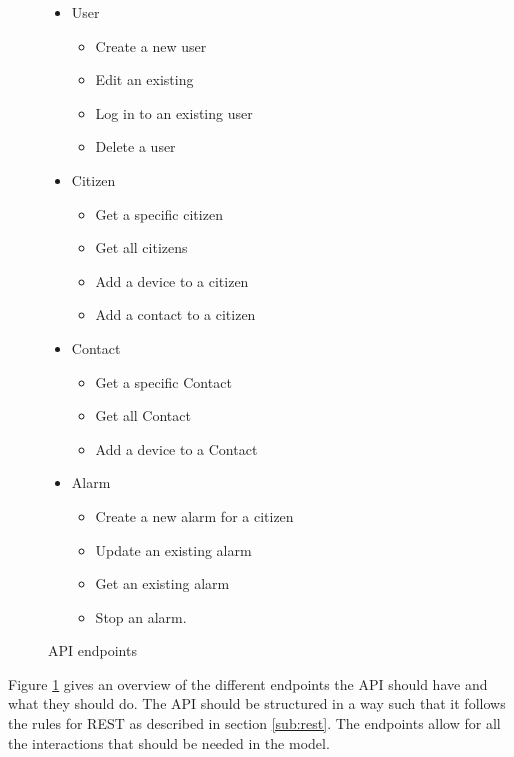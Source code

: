 \begin{figure}[H]
    \centering
    \begin{itemize}
        \item User
        \begin{itemize}
            \item Create a new user
            \item Edit an existing
            \item Log in to an existing user
            \item Delete a user
        \end{itemize}
        \item Citizen
        \begin{itemize}
            \item Get a specific citizen
            \item Get all citizens
            \item Add a device to a citizen
            \item Add a contact to a citizen
        \end{itemize}
        \item Contact
        \begin{itemize}
            \item Get a specific Contact
            \item Get all Contact
            \item Add a device to a Contact
        \end{itemize}
        \item Alarm
        \begin{itemize}
            \item Create a new alarm for a citizen
            \item Update an existing alarm
            \item Get an existing alarm
            \item Stop an alarm.
        \end{itemize}
    \end{itemize}
    \caption{API endpoints}
    \label{fig:design_endpoint}
\end{figure}

Figure \ref{fig:design_endpoint} gives an overview of the different endpoints the API should have and what they should do. The API should be structured in a way such that it follows the rules for REST as described in section \ref{sub:rest}. The endpoints allow for all the interactions that should be needed in the model.

